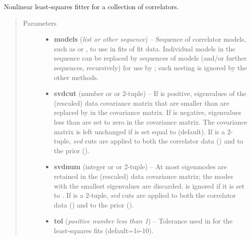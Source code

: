 \documentclass[letterpaper,10pt,english]{sphinxmanual}
\begin{document}
\begin{fulllineitems}
\label{corrfitter:corrfitter.CorrFitter}
Nonlinear least-squares fitter for a collection of correlators.
\begin{quote}\begin{description}
\item[{Parameters}] \leavevmode\begin{itemize}
\item {} 
\textbf{models} (\emph{list or other sequence}) -- Sequence of correlator models, such as 
{\hyperref[corrfitter:corrfitter.Corr2]{}} or {\hyperref[corrfitter:corrfitter.Corr3]{}}, 
to use in fits of fit data. Individual
models in the sequence can be replaced by sequences of models
(and/or further sequences, recursively) for use by
{\hyperref[corrfitter:corrfitter.CorrFitter.chained_lsqfit]{}}; such nesting
is ignored by the other methods.

\item {} 
\textbf{svdcut} (number or  or 2-tuple) -- If  is positive, eigenvalues  of the 
(rescaled) data covariance matrix that are smaller than
 are replaced by  in the
covariance matrix. If  is negative, eigenvalues less than
 are set to zero in the covariance matrix. The
covariance matrix is left unchanged if  is set equal to
 (default). If  is a 2-tuple, \emph{svd} cuts are applied
to both the correlator data () and to the prior
().

\item {} 
\textbf{svdnum} (integer or  or 2-tuple) -- At most  eigenmodes are retained in the 
(rescaled) data covariance matrix; the modes with the smallest
eigenvalues are discarded.  is ignored if it is set to
. If  is a 2-tuple, \emph{svd} cuts are applied to both
the correlator data () and to the prior ().

\item {} 
\textbf{tol} (\emph{positive number less than 1}) -- Tolerance used in  for the 
least-squares fits (default=1e-10).


\end{itemize}
\end{description}
\end{quote}
\end{fulllineitems}
\end{document}
